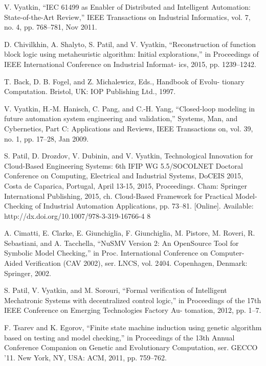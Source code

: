 \documentclass[14pt]{extarticle}
\theoremstyle{plain}
\theoremstyle{definition}
\begin{document}
\begin{thebibliography}{99}

V. Vyatkin, “IEC 61499 as Enabler of Distributed and Intelligent
Automation: State-of-the-Art Review,” IEEE Transactions on Industrial
Informatics, vol. 7, no. 4, pp. 768–781, Nov 2011.

D. Chivilkhin, A. Shalyto, S. Patil, and V. Vyatkin, “Reconstruction of
function block logic using metaheuristic algorithm: Initial explorations,”
in Proceedings of IEEE International Conference on Industrial Informat-
ics, 2015, pp. 1239–1242.

T. Back, D. B. Fogel, and Z. Michalewicz, Eds., Handbook of Evolu-
tionary Computation. Bristol, UK: IOP Publishing Ltd., 1997.

V. Vyatkin, H.-M. Hanisch, C. Pang, and C.-H. Yang, “Closed-loop
modeling in future automation system engineering and validation,”
Systems, Man, and Cybernetics, Part C: Applications and Reviews, IEEE
Transactions on, vol. 39, no. 1, pp. 17–28, Jan 2009.

S. Patil, D. Drozdov, V. Dubinin, and V. Vyatkin, Technological
Innovation for Cloud-Based Engineering Systems: 6th IFIP WG
5.5/SOCOLNET Doctoral Conference on Computing, Electrical and
Industrial Systems, DoCEIS 2015, Costa de Caparica, Portugal, April
13-15, 2015, Proceedings. Cham: Springer International Publishing,
2015, ch. Cloud-Based Framework for Practical Model-Checking of
Industrial Automation Applications, pp. 73–81. [Online]. Available:
http://dx.doi.org/10.1007/978-3-319-16766-4 8

A. Cimatti, E. Clarke, E. Giunchiglia, F. Giunchiglia, M. Pistore,
M. Roveri, R. Sebastiani, and A. Tacchella, “NuSMV Version 2: An
OpenSource Tool for Symbolic Model Checking,” in Proc. International
Conference on Computer-Aided Verification (CAV 2002), ser. LNCS, vol.
2404. Copenhagen, Denmark: Springer, 2002.

S. Patil, V. Vyatkin, and M. Sorouri, “Formal verification of Intelligent
Mechatronic Systems with decentralized control logic,” in Proceedings
of the 17th IEEE Conference on Emerging Technologies Factory Au-
tomation, 2012, pp. 1–7.

F. Tsarev and K. Egorov, “Finite state machine induction using genetic
algorithm based on testing and model checking,” in Proceedings of
the 13th Annual Conference Companion on Genetic and Evolutionary
Computation, ser. GECCO ’11. New York, NY, USA: ACM, 2011, pp.
759–762.


\end{thebibliography}
\end{document}
